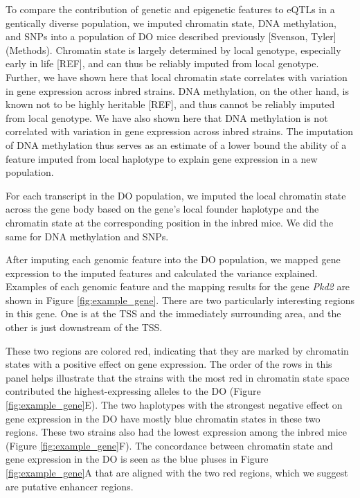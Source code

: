 \documentclass[10pt,letterpaper]{article}
\begin{document}
To compare the contribution of genetic and epigenetic features to eQTLs
in a gentically diverse population, we imputed chromatin state, DNA
methylation, and SNPs into a population of DO mice described previously
{[}Svenson, Tyler{]} (Methods). Chromatin state is largely determined by
local genotype, especially early in life {[}REF{]}, and can thus be
reliably imputed from local genotype. Further, we have shown here that
local chromatin state correlates with variation in gene expression
across inbred strains. DNA methylation, on the other hand, is known not
to be highly heritable {[}REF{]}, and thus cannot be reliably imputed
from local genotype. We have also shown here that DNA methylation is not
correlated with variation in gene expression across inbred strains. The
imputation of DNA methylation thus serves as an estimate of a lower
bound the ability of a feature imputed from local haplotype to explain
gene expression in a new population.

For each transcript in the DO population, we imputed the local chromatin
state across the gene body based on the gene's local founder haplotype
and the chromatin state at the corresponding position in the inbred
mice. We did the same for DNA methylation and SNPs.

After imputing each genomic feature into the DO population, we mapped
gene expression to the imputed features and calculated the variance
explained. Examples of each genomic feature and the mapping results for
the gene \textit{Pkd2} are shown in Figure \ref{fig:example_gene}. There
are two particularly interesting regions in this gene. One is at the TSS
and the immediately surrounding area, and the other is just downstream
of the TSS.

These two regions are colored red, indicating that they are marked by
chromatin states with a positive effect on gene expression. The order of
the rows in this panel helps illustrate that the strains with the most
red in chromatin state space contributed the highest-expressing alleles
to the DO (Figure \ref{fig:example_gene}E). The two haplotypes with the
strongest negative effect on gene expression in the DO have mostly blue
chromatin states in these two regions. These two strains also had the
lowest expression among the inbred mice (Figure
\ref{fig:example_gene}F). The concordance between chromatin state and
gene expression in the DO is seen as the blue pluses in Figure
\ref{fig:example_gene}A that are aligned with the two red regions, which
we suggest are putative enhancer regions.
\end{document}

